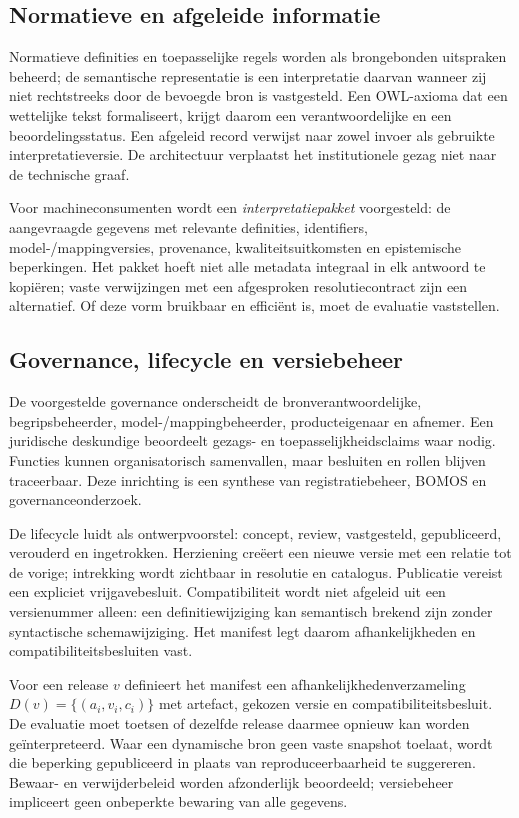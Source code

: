 \subsection{Normatieve en afgeleide informatie}
Normatieve definities en toepasselijke regels worden als brongebonden uitspraken beheerd; de semantische representatie is een interpretatie daarvan wanneer zij niet rechtstreeks door de bevoegde bron is vastgesteld. Een OWL-axioma dat een wettelijke tekst formaliseert, krijgt daarom een verantwoordelijke en een beoordelingsstatus. Een afgeleid record verwijst naar zowel invoer als gebruikte interpretatieversie. De architectuur verplaatst het institutionele gezag niet naar de technische graaf.

Voor machineconsumenten wordt een \emph{interpretatiepakket} voorgesteld: de aangevraagde gegevens met relevante definities, identifiers, model-/mappingversies, provenance, kwaliteitsuitkomsten en epistemische beperkingen. Het pakket hoeft niet alle metadata integraal in elk antwoord te kopiëren; vaste verwijzingen met een afgesproken resolutiecontract zijn een alternatief. Of deze vorm bruikbaar en efficiënt is, moet de evaluatie vaststellen.

\subsection{Governance, lifecycle en versiebeheer}
De voorgestelde governance onderscheidt de bronverantwoordelijke, begripsbeheerder, model-/mappingbeheerder, producteigenaar en afnemer. Een juridische deskundige beoordeelt gezags- en toepasselijkheidsclaims waar nodig. Functies kunnen organisatorisch samenvallen, maar besluiten en rollen blijven traceerbaar. Deze inrichting is een synthese van registratiebeheer, BOMOS en governance\-onderzoek. \citep{S10,S23,L07}

De lifecycle luidt als ontwerpvoorstel: concept, review, vastgesteld, gepubliceerd, verouderd en ingetrokken. Herziening creëert een nieuwe versie met een relatie tot de vorige; intrekking wordt zichtbaar in resolutie en catalogus. Publicatie vereist een expliciet vrijgavebesluit. Compatibiliteit wordt niet afgeleid uit een versienummer alleen: een definitiewijziging kan semantisch brekend zijn zonder syntactische schemawijziging. Het manifest legt daarom afhankelijkheden en compatibiliteitsbesluiten vast.

Voor een release $v$ definieert het manifest een afhankelijkhedenverzameling $D(v)=\{(a_i,v_i,c_i)\}$ met artefact, gekozen versie en compatibiliteitsbesluit. De evaluatie moet toetsen of dezelfde release daarmee opnieuw kan worden geïnterpreteerd. Waar een dynamische bron geen vaste snapshot toelaat, wordt die beperking gepubliceerd in plaats van reproduceerbaarheid te suggereren. Bewaar- en verwijderbeleid worden afzonderlijk beoordeeld; versiebeheer impliceert geen onbeperkte bewaring van alle gegevens.

